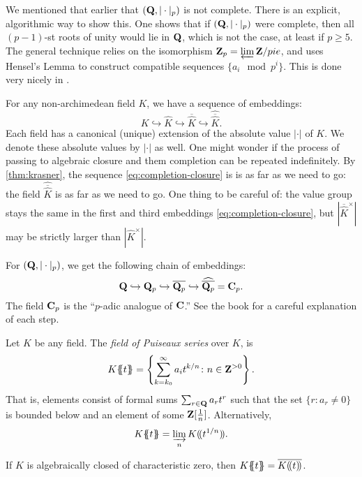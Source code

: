 We mentioned that earlier that $(\mathbf{Q},|\cdot|_p)$ is not complete. There is an 
explicit, algorithmic way to show this. One shows that if $(\mathbf{Q},|\cdot|_p)$ 
were complete, then all $(p-1)$-st roots of unity would lie in $\mathbf{Q}$, which is 
not the case, at least if $p\geqslant 5$. The general technique relies on the 
isomorphism $\mathbf{Z}_p=\varprojlim \mathbf{Z}/pie$, and uses Hensel's Lemma to construct 
compatible sequences $\{a_i\mod{p^i}\}$. This is done very nicely in 
\cite[3.2.3]{gouvea-1997}. 

For any non-archimedean field $K$, we have a sequence of embeddings:
\begin{equation}\label{eq:completion-closure}
  K \hookrightarrow 
  \widehat K \hookrightarrow 
  \overline{\widehat K} \hookrightarrow 
  \widehat{\overline{\widehat K}} .
\end{equation}
Each field has a canonical (unique) extension of the absolute value $|\cdot|$ 
of $K$. We denote these absolute values by $|\cdot|$ as well. One might wonder 
if the process of passing to algebraic closure and them completion can be 
repeated indefinitely. By \autoref{thm:krasner}, the sequence 
\eqref{eq:completion-closure} is is as far as we need to go: the field 
$\widehat{\overline{\widehat K}}$ is as far as we need to go. One thing to be 
careful of: the value group stays the same in the first and third embeddings 
\eqref{eq:completion-closure}, but 
$|\overline{\widehat K}^\times|$ may be strictly larger than 
$|\widehat K^\times|$. 

\begin{example}
For $(\mathbf{Q},|\cdot|_p)$, we get the following chain of embeddings:
\[
  \mathbf{Q}\hookrightarrow \mathbf{Q}_p \hookrightarrow \overline{\mathbf{Q}_p} \hookrightarrow \widehat{\overline{\mathbf{Q}_p}} = \mathbf{C}_p .
\]
The field $\mathbf{C}_p$ is the ``$p$-adic analogue of $\mathbf{C}$.'' See the book 
\cite{koblitz-1984} for a careful explanation of each step. 
\end{example}

\begin{definition}
Let $K$ be any field. The \emph{field of Puiseaux series} over $K$, is 
\[
  K\{\!\!\{t\}\!\!\} = \left\{\sum_{k=k_0}^\infty a_i t^{k/n}\colon n\in \mathbf{Z}^{>0}\right\} .
\]
That is, elements consist of formal sums $\sum_{r\in \mathbf{Q}} a_r t^r$ such that 
the set $\{r\colon a_r\ne 0\}$ is bounded below and an element of some 
$\mathbf{Z}[\frac 1 n]$. Alternatively, 
\[
  K\{\!\!\{t\}\!\!\} = \varinjlim_n K(\!( t^{1/n})\!) .
\]
\end{definition}

\begin{theorem}[Newton]
If $K$ is algebraically closed of characteristic zero, then 
$K\{\!\!\{t\}\!\!\} = \overline{K(\!( t)\!)}$. 
\end{theorem}

